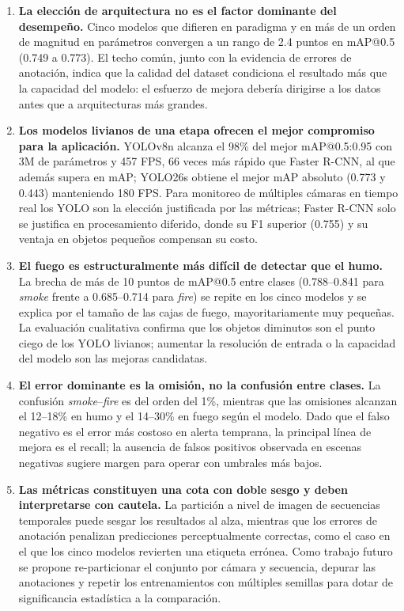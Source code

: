 \documentclass[conference]{IEEEtran}
\begin{document}
\begin{enumerate}

\item \textbf{La elección de arquitectura no es el factor dominante del
desempeño.} Cinco modelos que difieren en paradigma y en más de un orden de
magnitud en parámetros convergen a un rango de 2.4 puntos en mAP@0.5 (0.749
a 0.773). El techo común, junto con la evidencia de errores de anotación,
indica que la calidad del dataset condiciona el resultado más que la
capacidad del modelo: el esfuerzo de mejora debería dirigirse a los datos
antes que a arquitecturas más grandes.

\item \textbf{Los modelos livianos de una etapa ofrecen el mejor compromiso
para la aplicación.} YOLOv8n alcanza el 98\% del mejor mAP@0.5:0.95 con 3M
de parámetros y 457 FPS, 66 veces más rápido que Faster R-CNN, al que además
supera en mAP; YOLO26s obtiene el mejor mAP absoluto (0.773 y 0.443)
manteniendo 180 FPS. Para monitoreo de múltiples cámaras en tiempo real los
YOLO son la elección justificada por las métricas; Faster R-CNN solo se
justifica en procesamiento diferido, donde su F1 superior (0.755) y su
ventaja en objetos pequeños compensan su costo.

\item \textbf{El fuego es estructuralmente más difícil de detectar que el
humo.} La brecha de más de 10 puntos de mAP@0.5 entre clases (0.788--0.841
para \textit{smoke} frente a 0.685--0.714 para \textit{fire}) se repite en
los cinco modelos y se explica por el tamaño de las cajas de fuego,
mayoritariamente muy pequeñas. La evaluación cualitativa confirma que los
objetos diminutos son el punto ciego de los YOLO livianos; aumentar la
resolución de entrada o la capacidad del modelo son las mejoras candidatas.

\item \textbf{El error dominante es la omisión, no la confusión entre
clases.} La confusión \textit{smoke}--\textit{fire} es del orden del 1\%,
mientras que las omisiones alcanzan el 12--18\% en humo y el 14--30\% en
fuego según el modelo. Dado que el falso negativo es el error más costoso en
alerta temprana, la principal línea de mejora es el recall; la ausencia de
falsos positivos observada en escenas negativas sugiere margen para operar
con umbrales más bajos.

\item \textbf{Las métricas constituyen una cota con doble sesgo y deben
interpretarse con cautela.} La partición a nivel de imagen de secuencias
temporales puede sesgar los resultados al alza, mientras que los
errores de anotación penalizan predicciones perceptualmente correctas, como
el caso en el que los cinco modelos revierten una etiqueta errónea. Como
trabajo futuro se propone re-particionar el conjunto por cámara y secuencia,
depurar las anotaciones y repetir los entrenamientos con múltiples semillas
para dotar de significancia estadística a la comparación.

\end{enumerate}
\end{document}

